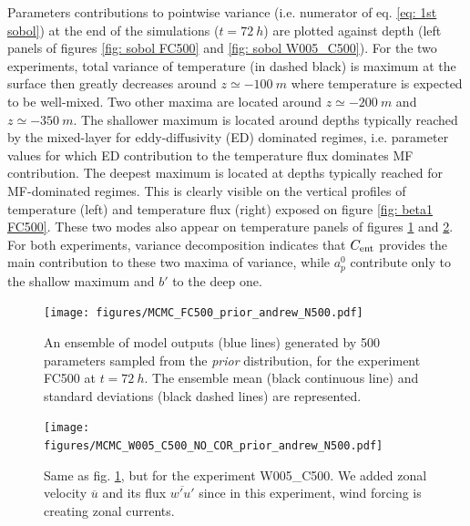 \documentclass[draft]{agujournal2019}
\begin{document}
Parameters contributions to pointwise variance (i.e. numerator of eq. \eqref{eq: 1st sobol}) at the end of the simulations ($t=\SI{72}{h}$) are plotted against depth (left panels of figures \ref{fig: sobol FC500} and \ref{fig: sobol W005_C500}). For the two experiments, total variance of temperature (in dashed black) is maximum at the surface then greatly decreases around $z\simeq\SI{-100}{m}$ where temperature is expected to be well-mixed. Two other maxima are located around $z\simeq\SI{-200}{m}$ and $z\simeq\SI{-350}{m}$. The shallower maximum is located around depths typically reached by the mixed-layer for eddy-diffusivity (ED) dominated regimes, i.e. parameter values for which ED contribution to the temperature flux dominates MF contribution. The deepest maximum is located at depths typically reached for MF-dominated regimes. This is clearly visible on the vertical profiles of temperature (left) and temperature flux (right) exposed on figure \ref{fig: beta1 FC500}. These two modes also appear on temperature panels of figures \ref{fig: andrew prior FC500} and \ref{fig: andrew prior WC500}. For both experiments, variance decomposition indicates that $C_{\rm ent}$ provides the main contribution to these two maxima of variance, while $a_p^0$ contribute only to the shallow maximum and $b'$ to the deep one. 
%
\begin{figure}
    \texttt{[image: figures/MCMC\_FC500\_prior\_andrew\_N500.pdf]}
    \caption{An ensemble of model outputs (blue lines) generated by 500 parameters sampled from the \textit{prior} distribution, for the experiment FC500 at $t=\SI{72}{h}$. The ensemble mean (black continuous line) and standard deviations (black dashed lines) are represented.  } 
    \label{fig: andrew prior FC500}
\end{figure}
%
\begin{figure}
    \texttt{[image: figures/MCMC\_W005\_C500\_NO\_COR\_prior\_andrew\_N500.pdf]}
    \caption{Same as fig. \ref{fig: andrew prior FC500}, but for the experiment W005\_C500. We added zonal velocity $\overline{u}$ and its flux $\overline{w'u'}$ since in this experiment, wind forcing is creating zonal currents.}
    \label{fig: andrew prior WC500}
\end{figure}
%
\end{document}
